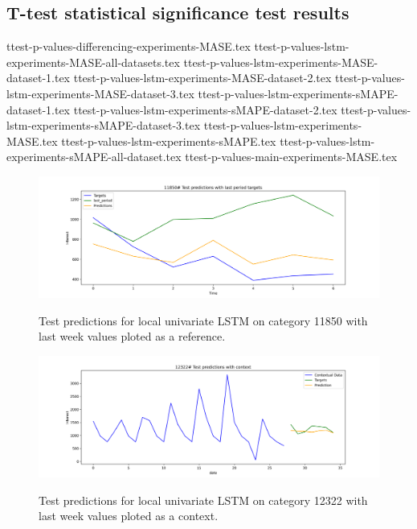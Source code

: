 \subsection{T-test statistical significance test results}
{ttest-p-values-differencing-experiments-MASE.tex}
{ttest-p-values-lstm-experiments-MASE-all-datasets.tex}
{ttest-p-values-lstm-experiments-MASE-dataset-1.tex}
{ttest-p-values-lstm-experiments-MASE-dataset-2.tex}
{ttest-p-values-lstm-experiments-MASE-dataset-3.tex}
{ttest-p-values-lstm-experiments-sMAPE-dataset-1.tex}
{ttest-p-values-lstm-experiments-sMAPE-dataset-2.tex}
{ttest-p-values-lstm-experiments-sMAPE-dataset-3.tex}
{ttest-p-values-lstm-experiments-MASE.tex}
{ttest-p-values-lstm-experiments-sMAPE.tex}
{ttest-p-values-lstm-experiments-sMAPE-all-dataset.tex}
{ttest-p-values-main-experiments-MASE.tex}


\begin{figure}
  \centering
  \caption{Test predictions for local univariate LSTM on category 11850 with last week values ploted as a reference.}
  \includegraphics[width=\textwidth]{./figs/results/predictions/11850_Test_predictions_with_last_period_targets.png}
  \hfill
  \label{fig:results:predictions:11850-Test_predictions_with_last_period_targets.png}
\end{figure}

\begin{figure}
  \centering
  \caption{Test predictions for local univariate LSTM on category 12322 with last week values ploted as a context.}
  \includegraphics[width=\textwidth]{./figs/results/predictions/12322_Test_predictions_with_context.png}
  \hfill
  \label{fig:results:predictions:12322-Test_predictions_with_last_period_context.png}
\end{figure}

